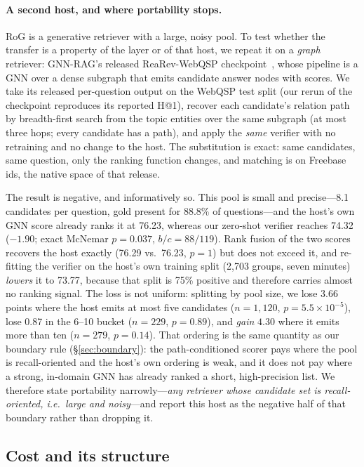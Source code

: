 \documentclass[sigconf,review,anonymous]{acmart}
\begin{document}
\paragraph{A second host, and where portability stops.}
RoG is a generative retriever with a large, noisy pool. To test whether the transfer is a property of the layer or of that host, we repeat it on a \emph{graph} retriever: GNN-RAG's released ReaRev-WebQSP checkpoint~\cite{mavromatis2024gnnrag}, whose pipeline is a GNN over a dense subgraph that emits candidate answer nodes with scores. We take its released per-question output on the WebQSP test split (our rerun of the checkpoint reproduces its reported H@1), recover each candidate's relation path by breadth-first search from the topic entities over the same subgraph (at most three hops; every candidate has a path), and apply the \emph{same} verifier with no retraining and no change to the host. The substitution is exact: same candidates, same question, only the ranking function changes, and matching is on Freebase ids, the native space of that release.

The result is negative, and informatively so. This pool is small and precise---8.1 candidates per question, gold present for 88.8\% of questions---and the host's own GNN score already ranks it at 76.23, whereas our zero-shot verifier reaches 74.32 ($-1.90$; exact McNemar $p=0.037$, $b/c=88/119$). Rank fusion of the two scores recovers the host exactly (76.29 vs.\ 76.23, $p=1$) but does not exceed it, and re-fitting the verifier on the host's own training split (2{,}703 groups, seven minutes) \emph{lowers} it to 73.77, because that split is 75\% positive and therefore carries almost no ranking signal. The loss is not uniform: splitting by pool size, we lose $3.66$ points where the host emits at most five candidates ($n=1{,}120$, $p=5.5\times10^{-5}$), lose 0.87 in the 6--10 bucket ($n=229$, $p=0.89$), and \emph{gain} $4.30$ where it emits more than ten ($n=279$, $p=0.14$). That ordering is the same quantity as our boundary rule (\S\ref{sec:boundary}): the path-conditioned scorer pays where the pool is recall-oriented and the host's own ordering is weak, and it does not pay where a strong, in-domain GNN has already ranked a short, high-precision list. We therefore state portability narrowly---\emph{any retriever whose candidate set is recall-oriented, i.e.\ large and noisy}---and report this host as the negative half of that boundary rather than dropping it.

\subsection{Cost and its structure}
\label{sec:cost}
\end{document}
